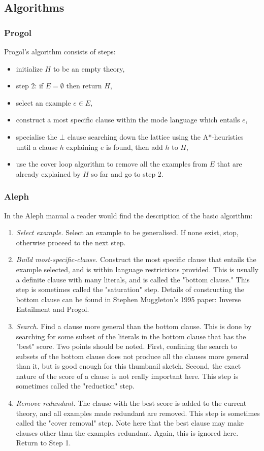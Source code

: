 \subsection{Algorithms}

\subsubsection{Progol\cite{muggleton1995inverse}\cite{kimber2012learning}}
Progol's algorithm consists of steps:
\begin{itemize}
\item initialize $H$ to be an empty theory,
\item step 2: if $E=\emptyset$ then return $H$,
\item select an example $e \in E$,
\item construct a most specific clause within the mode language which entails $e$,
\item specialise the $\bot$ clause searching down the lattice using the A*-heuristics until a clause $h$ explaining $e$ is found, then add $h$ to $H$,
\item use the cover loop algorithm to remove all the examples from $E$ that are already explained by $H$ so far and go to step 2.
\end{itemize}

\subsubsection{Aleph}
In the Aleph manual\cite{aleph2007} a reader would find the description of the basic algorithm:
\begin{enumerate}
\item \emph{Select example.} Select an example to be generalised. If none exist, stop, otherwise proceed to the next step.
\item \emph{Build most-specific-clause.} Construct the most specific clause that entails the example selected, and is within language restrictions provided. This is usually a definite clause with many literals, and is called the "bottom clause." This step is sometimes called the "saturation" step. Details of constructing the bottom clause can be found in Stephen Muggleton's 1995 paper: Inverse Entailment and Progol\cite{muggleton1995inverse}.
\item \emph{Search.} Find a clause more general than the bottom clause. This is done by searching for some subset of the literals in the bottom clause that has the "best" score. Two points should be noted. First, confining the search to subsets of the bottom clause does not produce all the clauses more general than it, but is good enough for this thumbnail sketch. Second, the exact nature of the score of a clause is not really important here. This step is sometimes called the "reduction" step.
\item \emph{Remove redundant.} The clause with the best score is added to the current theory, and all examples made redundant are removed. This step is sometimes called the "cover removal" step. Note here that the best clause may make clauses other than the examples redundant. Again, this is ignored here. Return to Step 1.
\end{enumerate}

